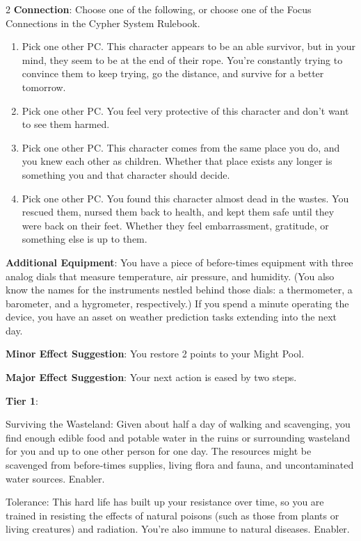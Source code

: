 \begin{multicols}{2}
\textbf{Connection}: Choose one of the following, or choose one of the Focus Connections in the Cypher System Rulebook.

\begin{enumerate}
\item Pick one other PC. This character appears to be an able survivor, but in your mind, they seem to be at the end of their rope. You’re constantly trying to convince them to keep trying, go the distance, and survive for a better tomorrow.
\item Pick one other PC. You feel very protective of this character and don’t want to see them harmed.
\item Pick one other PC. This character comes from the same place you do, and you knew each other as children. Whether that place exists any longer is something you and that character should decide.
\item Pick one other PC. You found this character almost dead in the wastes. You rescued them, nursed them back to health, and kept them safe until they were back on their feet. Whether they feel embarrassment, gratitude, or something else is up to them.
\end{enumerate}

\textbf{Additional Equipment}: You have a piece of before‑times equipment with three analog dials that measure temperature, air pressure, and humidity. (You also know the names for the instruments nestled behind those dials: a thermometer, a barometer, and a hygrometer, respectively.) If you spend a minute operating the device, you have an asset on weather prediction tasks extending into the next day.

\textbf{Minor Effect Suggestion}: You restore 2 points to your Might Pool.

\textbf{Major Effect Suggestion}: Your next action is eased by two steps.

\textbf{Tier 1}:

Surviving the Wasteland: Given about half a day of walking and scavenging, you find enough edible food and potable water in the ruins or surrounding wasteland for you and up to one other person for one day. The resources might be scavenged from before‑times supplies, living flora and fauna, and uncontaminated water sources. Enabler.

Tolerance: This hard life has built up your resistance over time, so you are trained in resisting the effects of natural poisons (such as those from plants or living creatures) and radiation. You’re also immune to natural diseases. Enabler.


\end{multicols}
